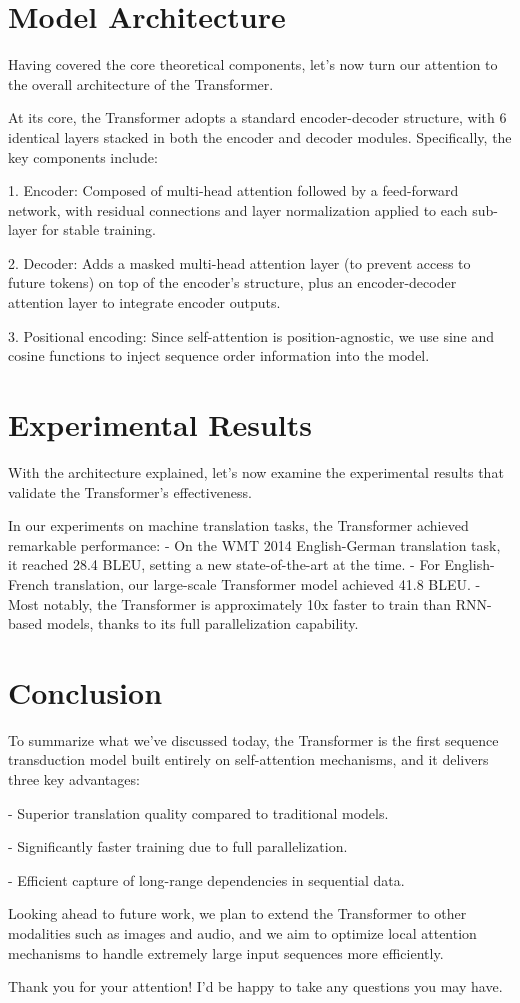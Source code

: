 \documentclass[12pt,a4paper]{article}
\begin{document}
\section*{Model Architecture}
Having covered the core theoretical components, let's now turn our attention to the overall architecture of the Transformer. 

At its core, the Transformer adopts a standard encoder-decoder structure, with 6 identical layers stacked in both the encoder and decoder modules. Specifically, the key components include:\
\par 1. Encoder: Composed of multi-head attention followed by a feed-forward network, with residual connections and layer normalization applied to each sub-layer for stable training.\
\par 2. Decoder: Adds a masked multi-head attention layer (to prevent access to future tokens) on top of the encoder's structure, plus an encoder-decoder attention layer to integrate encoder outputs.\
\par 3. Positional encoding: Since self-attention is position-agnostic, we use sine and cosine functions to inject sequence order information into the model.

\section*{Experimental Results}
With the architecture explained, let's now examine the experimental results that validate the Transformer's effectiveness. 

In our experiments on machine translation tasks, the Transformer achieved remarkable performance:
- On the WMT 2014 English-German translation task, it reached 28.4 BLEU, setting a new state-of-the-art at the time.
- For English-French translation, our large-scale Transformer model achieved 41.8 BLEU.
- Most notably, the Transformer is approximately 10x faster to train than RNN-based models, thanks to its full parallelization capability.

\section*{Conclusion}
To summarize what we've discussed today, the Transformer is the first sequence transduction model built entirely on self-attention mechanisms, and it delivers three key advantages:
\par - Superior translation quality compared to traditional models.
\par - Significantly faster training due to full parallelization.
\par - Efficient capture of long-range dependencies in sequential data.

Looking ahead to future work, we plan to extend the Transformer to other modalities such as images and audio, and we aim to optimize local attention mechanisms to handle extremely large input sequences more efficiently.

Thank you for your attention! I'd be happy to take any questions you may have.
\end{document}
